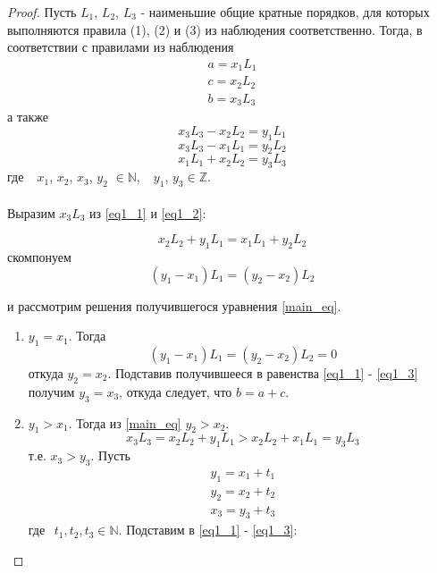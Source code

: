 \documentclass{article}
\begin{document}
	\begin{proof}
		Пусть $L_1$, $L_2$, $L_3$ - наименьшие общие кратные порядков, для которых выполняются правила (1), (2) и (3) из наблюдения соответственно.
		Тогда, в соответствии с правилами из наблюдения
		\begin{equation*}
			\begin{gathered}
				a = x_1 L_1\\
				c = x_2 L_2\\	 
				b = x_3 L_3
			\end{gathered}
		\end{equation*}
		а также
		\begin{equation} \label{eq1_1}
			x_3 L_3 - x_2 L_2 = y_1 L_1
		\end{equation}
		\begin{equation} \label{eq1_2}
			x_3 L_3 - x_1 L_1 = y_2 L_2
		\end{equation}
		\begin{equation} \label{eq1_3}
			x_1 L_1 + x_2 L_2 = y_3 L_3			
		\end{equation}
		где  $\hspace{5pt}$ $x_1$, $x_2$, $x_3$, $y_2$  $\in \mathbb{N}$, $\hspace{5pt}$ $y_1$, $y_3 \in \mathbb{Z}$.
		\\
		\\
		Выразим $x_3 L_3$ из \eqref{eq1_1} и \eqref{eq1_2}:
		
		$$
		x_2 L_2 + y_1 L_1 = x_1 L_1 + y_2 L_2
		$$
		скомпонуем
		\begin{equation}\label{main_eq}
		(y_1 - x_1) L_1 = (y_2 - x_2) L_2
		\end{equation}
		
		и рассмотрим решения получившегося уравнения \eqref{main_eq}.
		
		\begin{enumerate}
		\item 
			$y_1 = x_1$. Тогда 
			$$
			(y_1 - x_1) L_1 = (y_2 - x_2) L_2 = 0
			$$
			откуда $y_2 = x_2$.
			Подставив получившееся в равенства \eqref{eq1_1} - \eqref{eq1_3} получим $y_3 = x_3$, откуда следует, что $b = a + c$.
			
		\item 
			$y_1 > x_1$. Тогда из \eqref{main_eq} $y_2 > x_2$.
			$$
			x_3 L_3 = x_2 L_2 + y_1 L_1 > x_2 L_2 + x_1 L_1 = y_3 L_3
			$$ т.е. $x_3 > y_3$.
			Пусть 
			\begin{equation*}
				\begin{gathered}
					y_1 = x_1 + t_1\\
					y_2 = x_2 + t_2\\	 
					x_3 = y_3 + t_3
				\end{gathered}
			\end{equation*}
			где $\hspace{5pt} t_1, t_2, t_3 \in \mathbb{N}$.
			Подставим в \eqref{eq1_1} - \eqref{eq1_3}:
			

\end{enumerate}
\end{proof}
\end{document}
